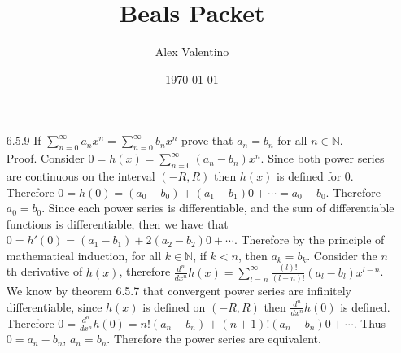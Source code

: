 \documentclass[12pt, letterpaper]{article}
\date{\today}
\author{Alex Valentino}
\title{Beals Packet}
\newcommand{\N}{\mathbb{N}}
\begin{document}
\begin{enumerate}
    \item[6.5.9] If $\sum_{n=0}^\infty a_nx^n = \sum_{n=0}^\infty b_nx^n $
    prove that $a_n = b_n$ for all $n \in \N$.\\
    Proof.  Consider $0 = h(x) = \sum_{n=0}^\infty (a_n-b_n) x^n$.  Since both power series are continuous on the interval $(-R,R)$ then $h(x)$ is defined for 0.  Therefore $0 = h(0) = (a_0-b_0) + (a_1-b_1)0 + \cdots = a_0-b_0$.
    Therefore $a_0 = b_0$.  Since each power series is differentiable, and the sum of differentiable functions is differentiable, then we have that
    $0 = h'(0) = (a_1 - b_1) + 2(a_2-b_2)0 + \cdots$.  
    Therefore by the principle of mathematical induction, for all $k \in \N$, 
    if $k < n$, then $a_k = b_k$.  Consider the $n$th derivative of $h(x)$,
    therefore $\frac{d^n}{dx^n}h(x) = \sum_{l=n}^\infty \frac{(l)!}{(l-n)!}(a_l-b_l)x^{l-n}$.  We know by theorem 6.5.7 that convergent power series are 
    infinitely differentiable, since $h(x)$ is defined on $(-R,R)$ then 
    $\frac{d^n}{dx^n}h(0)$ is defined.  Therefore 
    $0 =\frac{d^n}{dx^n}h(0) = n!(a_n-b_n) + (n+1)!(a_n - b_n)0 + \cdots$.
    Thus $0= a_n - b_n$, $a_n = b_n$.  Therefore the power series are equivalent.
\end{enumerate}
\end{document}

